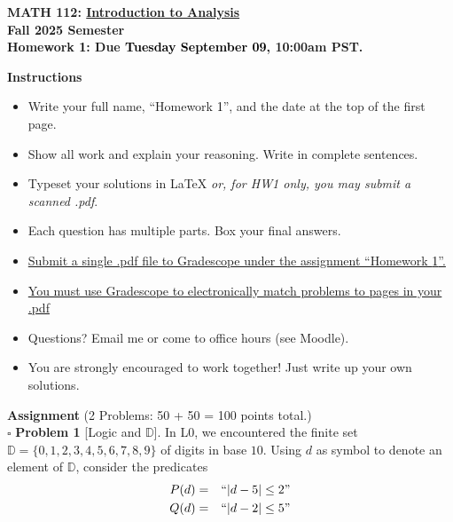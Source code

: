 \documentclass[11pt]{article}
\numberwithin{equation}{section}
\begin{document}
\hypersetup{linkcolor=black}

\begin{center} 
\textbf{{MATH 112: \underline{Introduction to Analysis}}}\\
\textbf{{Fall 2025 Semester}}\\
\textbf{{Homework \textcolor{black}{1}: Due \textcolor{black}{Tuesday} \textcolor{black}{September} \textcolor{black}{09}, 10:00am PST.}}\\
 \end{center}

 \noindent \textbf{Instructions}
 \begin{itemize}
 \itemsep0em
 \item Write your full name, ``Homework \textcolor{black}{1}'', and the date at the top of the first page.
 \item Show all work and explain your reasoning.  Write in complete sentences.
 \item Typeset your solutions in LaTeX \textit{or, for HW1 only, you may submit a scanned .pdf}.
 \item Each question has multiple parts. Box your final answers.
 \item \underline{Submit a single .pdf file to Gradescope under the assignment ``Homework \textcolor{black}{1}''.}
 \item \underline{You must use Gradescope to electronically match problems to pages in your .pdf}
 \item Questions? Email me or come to office hours (see Moodle).
 \item You are strongly encouraged to work together!  Just write up your own solutions.\\
 \end{itemize}
 \noindent \textbf{Assignment} (2 Problems: 50 + 50 = 100 points total.) \\
  $ \ $\\
   \noindent $\square$ \textbf{Problem 1}  [\textsf{Logic and $\mathbb{D}$}]. In \textsf{L0}, we encountered the finite set $\mathbb{D} = \{0,1,2,3,4,5,6,7,8,9\}$ of digits in base $10$.  Using $d$ as symbol to denote an element of $\mathbb{D}$, consider the predicates \begin{eqnarray} P(d) &=& \textnormal{``$|d-5| \leq 2$''} \nonumber \\ Q(d) &=& \textnormal{``$|d-2| \leq 5$''}  \nonumber \end{eqnarray}
   
\end{document}
